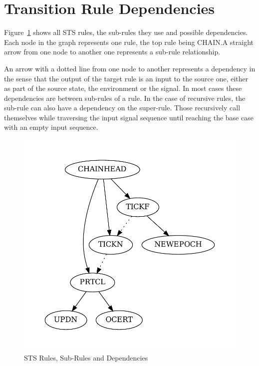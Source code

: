 \section{Transition Rule Dependencies}
\label{sec:sts-rules-overview}

Figure~\ref{fig:sts-rules-dependencies} shows all STS rules, the sub-rules they
use and possible dependencies. Each node in the graph represents one rule, the
top rule being CHAIN.\@ A straight arrow from one node to another one represents
a sub-rule relationship.

An arrow with a dotted line from one node to another represents a dependency in
the sense that the output of the target rule is an input to the source one,
either as part of the source state, the environment or the signal. In most cases
these dependencies are between sub-rules of a rule. In the case of recursive
rules, the sub-rule can also have a dependency on the super-rule. Those
recursively call themselves while traversing the input signal sequence until
reaching the base case with an empty input sequence.

\begin{figure}[htp]
  \centering
  \includegraphics[width=\textwidth]{rules}
  \caption{STS Rules, Sub-Rules and Dependencies}
  \label{fig:sts-rules-dependencies}
\end{figure}

